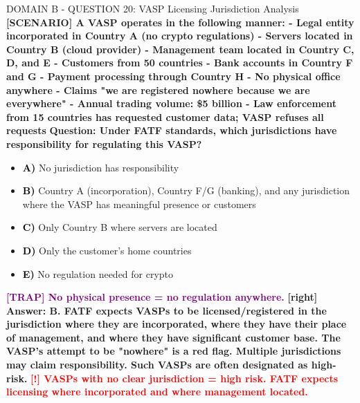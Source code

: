 \documentclass[11pt,a4paper]{beamer}
\newcommand{\redflag}[1]{\textcolor{red}{\textbf{[!] #1}}}
\newcommand{\trap}[1]{\textcolor{purple}{\textbf{[TRAP] #1}}}
\newcommand{\correct}[1]{\textcolor{green!50!black}{\textbf{[right] #1}}}
\newcommand{\scenario}[1]{\textcolor{blue!70!black}{\textbf{[SCENARIO] #1}}}
\newcommand{\option}[1]{\textcolor{black}{\textbf{#1}}}
\begin{document}
\begin{frame}{DOMAIN B - QUESTION 20: VASP Licensing Jurisdiction Analysis}
\scenario{A VASP operates in the following manner:
- Legal entity incorporated in Country A (no crypto regulations)
- Servers located in Country B (cloud provider)
- Management team located in Country C, D, and E
- Customers from 50 countries
- Bank accounts in Country F and G
- Payment processing through Country H
- No physical office anywhere
- Claims "we are registered nowhere because we are everywhere"
- Annual trading volume: \$5 billion
- Law enforcement from 15 countries has requested customer data; VASP refuses all requests}
\vspace{0.2cm}
\textbf{Question: Under FATF standards, which jurisdictions have responsibility for regulating this VASP?}
\vspace{0.1cm}
\begin{itemize}
    \item \option{A)} No jurisdiction has responsibility
    \item \option{B)} Country A (incorporation), Country F/G (banking), and any jurisdiction where the VASP has meaningful presence or customers
    \item \option{C)} Only Country B where servers are located
    \item \option{D)} Only the customer's home countries
    \item \option{E)} No regulation needed for crypto
\end{itemize}
\vspace{0.2cm}
\trap{No physical presence = no regulation anywhere.}
\correct{Answer: B. FATF expects VASPs to be licensed/registered in the jurisdiction where they are incorporated, where they have their place of management, and where they have significant customer base. The VASP's attempt to be "nowhere" is a red flag. Multiple jurisdictions may claim responsibility. Such VASPs are often designated as high-risk.}
\redflag{VASPs with no clear jurisdiction = high risk. FATF expects licensing where incorporated and where management located.}
\end{frame}
\end{document}
